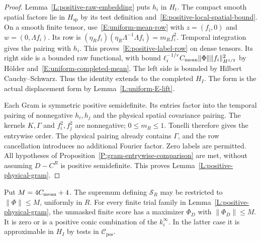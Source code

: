 \begin{proof}
  Lemma~\ref{L:positive-raw-embedding} puts $h_i$ in $H_t$.
  The compact smooth spatial factors lie in $H_{\mathrm{sp}}$
  by its test definition and~\eqref{E:positive-local-spatial-bound}.
  On a smooth finite tensor, use~\eqref{E:uniform-mean-row}
  with $z=(f_i,0)$ and $w=(0,\Lambda f_i)$.
  Its row is $(\eta_Rf_i)(\eta_R\Lambda^{-1}\Lambda f_i)=m_Rf_i^2$.
  Temporal integration gives the pairing with $h_i$.
  This proves~\eqref{E:positive-label-row} on dense tensors.
  Its right side is a bounded raw functional, with bound
  $\ell_i^{-1/r}C_{\rm mean}\|\Phi\|\|f_i\|_{H^{1/2}}^2$
  by Hölder and~\eqref{E:uniform-completed-mean}.
  The left side is bounded by Hilbert Cauchy--Schwarz.
  Thus the identity extends to the completed $H_I$.
  The form is the actual displacement form by
  Lemma~\ref{L:uniform-E-lift}.

  Each Gram is symmetric positive semidefinite.
  Its entries factor into the temporal pairing of nonnegative
  $h_i,h_j$ and the physical spatial covariance pairing.
  The kernels $K,\Gamma$ and $f_i^2,f_j^2$ are nonnegative;
  $0\le m_R\le1$. Tonelli therefore gives the entrywise order.
  The physical pairing already contains $\Gamma$, and the row
  cancellation introduces no additional Fourier factor.
  Zero labels are permitted.
  All hypotheses of Proposition~\ref{P:gram-entrywise-comparison}
  are met, without assuming $D-C^R$ is positive semidefinite.
  This proves Lemma~\ref{L:positive-physical-gram}.
\end{proof}

\begin{lemma}
  \label{L:positive-uniform-optimizer}
  Put $M=4C_{\rm mean}+4$.
  The supremum defining $\mathcal S_R$ may be restricted to
  $\|\Phi\|\le M$, uniformly in $R$.
  For every finite trial family in Lemma~\ref{L:positive-physical-gram},
  the unmasked finite score has a maximizer $\Phi_D$ with
  $\|\Phi_D\|\le M$. It is zero or is a positive conic combination
  of the $k_i^\infty$. In the latter case it is approximable in $H_I$
  by tests in $\mathcal C_{\mathrm{pos}}$.
\end{lemma}

